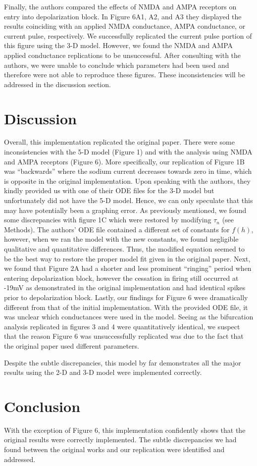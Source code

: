 Finally, the authors compared the effects of NMDA and AMPA receptors on entry into depolarization block. In Figure 6A1, A2, and A3 they displayed the results coinciding with an applied NMDA conductance, AMPA conductance, or current pulse, respectively. We successfully replicated the current pulse portion of this figure using the 3-D model. However, we found the NMDA and AMPA applied conductance replications to be unsuccessful. After consulting with the authors, we were unable to conclude which parameters had been used and therefore were not able to reproduce these figures. These inconsistencies will be addressed in the discussion section.  

\section{Discussion}

Overall, this implementation replicated the original paper. There were some inconsistencies with the 5-D model (Figure 1) and with the analysis using NMDA and AMPA receptors (Figure 6). More specifically, our replication of Figure 1B was “backwards” where the sodium current decreases towards zero in time, which is opposite in the original implementation. Upon speaking with the authors, they kindly provided us with one of their ODE files for the 3-D model but unfortunately did not have the 5-D model. Hence, we can only speculate that this may have potentially been a graphing error. As previously mentioned, we found some discrepancies with figure 1C which were restored by modifying $\tau_n$  (see Methods). The authors’ ODE file contained a different set of constants for $f(h)$, however, when we ran the model with the new constants, we found negligible qualitative and quantitative differences.  Thus, the modified equation seemed to be the best way to restore the proper model fit given in the original paper. Next, we found that Figure 2A had a shorter and less prominent “ringing” period when entering depolarization block, however the cessation in firing still occurred at -19mV as demonstrated in the original implementation and had identical spikes prior to depolarization block. Lastly, our findings for Figure 6 were dramatically different from that of the initial implementation. With the provided ODE file, it was unclear which conductances were used in the model. Seeing as the bifurcation analysis replicated in figures 3 and 4 were quantitatively identical, we suspect that the reason Figure 6 was unsuccessfully replicated was due to the fact that the original paper used different parameters.

Despite the subtle discrepancies, this model by far demonstrates all the major results using the 2-D and 3-D model were implemented correctly. 

\section{Conclusion}

With the exception of Figure 6, this implementation confidently shows that the original results were correctly implemented. The subtle discrepancies we had found between the original works and our replication were identified and addressed.  